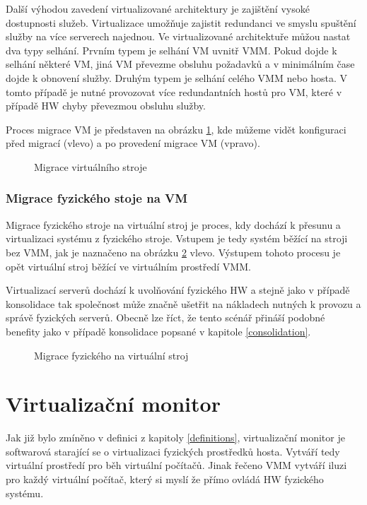 Další výhodou zavedení virtualizované architektury je zajištění vysoké dostupnosti služeb. Virtualizace umožňuje zajistit redundanci ve smyslu spuštění služby na více serverech najednou. Ve virtualizované architektuře můžou
nastat dva typy selhání. Prvním typem je selhání VM uvnitř VMM. Pokud dojde k selhání některé VM, jiná VM převezme obsluhu požadavků a v minimálním čase dojde k obnovení služby. Druhým typem je selhání celého VMM nebo hosta.
V tomto případě je nutné provozovat více redundantních hostů pro VM, které v případě HW chyby převezmou obsluhu služby.

Proces migrace VM je představen na obrázku \ref{migration1}, kde můžeme vidět konfiguraci před migrací (vlevo) a po provedení migrace VM (vpravo).

\begin{figure}
    \centering    
    \caption{Migrace virtuálního stroje}
    \label{migration1}
\end{figure}

\subsubsection*{Migrace fyzického stoje na VM}

Migrace fyzického stroje na virtuální stroj je proces, kdy dochází k přesunu a virtualizaci systému z fyzického stroje. Vstupem je tedy systém běžící na stroji bez VMM, jak je naznačeno na obrázku \ref{migration2} vlevo. 
Výstupem tohoto procesu je opět virtuální stroj běžící ve virtuálním prostředí VMM.

Virtualizací serverů dochází k uvolňování fyzického HW a stejně jako v případě konsolidace tak společnost může značně ušetřit na nákladech nutných k provozu a správě fyzických serverů. Obecně lze říct, že tento scénář přináší 
podobné benefity jako v případě konsolidace popsané v kapitole \ref{consolidation}.

\begin{figure}
    \centering    
    \caption{Migrace fyzického na virtuální stroj}
    \label{migration2}
\end{figure}

\section{Virtualizační monitor}
\label{vmm}

Jak již bylo zmíněno v definici z kapitoly \ref{definitions}, virtualizační monitor je softwarová starající se o virtualizaci fyzických prostředků hosta. Vytváří tedy virtuální prostředí pro běh virtuální počítačů.
Jinak řečeno VMM vytváří iluzi pro každý virtuální počítač, který si myslí že přímo ovládá HW fyzického systému.

